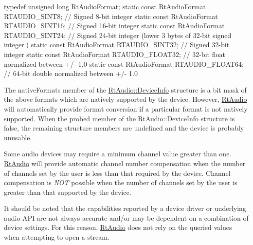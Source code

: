 \begin{DoxyCode}
\textcolor{keyword}{typedef} \textcolor{keywordtype}{unsigned} \textcolor{keywordtype}{long} \hyperlink{_rt_audio_8h_aafca92882d25915560018873221e44b8}{RtAudioFormat};
\textcolor{keyword}{static} \textcolor{keyword}{const} RtAudioFormat  RTAUDIO\_SINT8;   \textcolor{comment}{// Signed 8-bit integer}
\textcolor{keyword}{static} \textcolor{keyword}{const} RtAudioFormat  RTAUDIO\_SINT16;  \textcolor{comment}{// Signed 16-bit integer}
\textcolor{keyword}{static} \textcolor{keyword}{const} RtAudioFormat  RTAUDIO\_SINT24;  \textcolor{comment}{// Signed 24-bit integer (lower 3 bytes of 32-bit signed
       integer.)}
\textcolor{keyword}{static} \textcolor{keyword}{const} RtAudioFormat  RTAUDIO\_SINT32;  \textcolor{comment}{// Signed 32-bit integer}
\textcolor{keyword}{static} \textcolor{keyword}{const} RtAudioFormat  RTAUDIO\_FLOAT32; \textcolor{comment}{// 32-bit float normalized between +/- 1.0}
\textcolor{keyword}{static} \textcolor{keyword}{const} RtAudioFormat  RTAUDIO\_FLOAT64; \textcolor{comment}{// 64-bit double normalized between +/- 1.0}
\end{DoxyCode}


The {\ttfamily native\+Formats} member of the \hyperlink{struct_rt_audio_1_1_device_info}{Rt\+Audio\+::\+Device\+Info} structure is a bit mask of the above formats which are natively supported by the device. However, \hyperlink{class_rt_audio}{Rt\+Audio} will automatically provide format conversion if a particular format is not natively supported. When the {\ttfamily probed} member of the \hyperlink{struct_rt_audio_1_1_device_info}{Rt\+Audio\+::\+Device\+Info} structure is false, the remaining structure members are undefined and the device is probably unusable.

Some audio devices may require a minimum channel value greater than one. \hyperlink{class_rt_audio}{Rt\+Audio} will provide automatic channel number compensation when the number of channels set by the user is less than that required by the device. Channel compensation is {\itshape N\+OT} possible when the number of channels set by the user is greater than that supported by the device.

It should be noted that the capabilities reported by a device driver or underlying audio A\+PI are not always accurate and/or may be dependent on a combination of device settings. For this reason, \hyperlink{class_rt_audio}{Rt\+Audio} does not rely on the queried values when attempting to open a stream. 